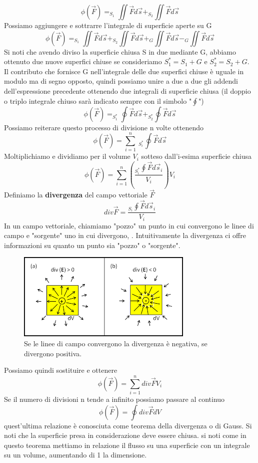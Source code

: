 \documentclass[10pt,a4paper]{article}
\begin{document}
\[\phi(\vec{F}) = _{S_1}\iint \vec{F}d\vec{s}+_{S_2}\iint \vec{F}d\vec{s}\]
Possiamo aggiungere e sottrarre l'integrale di superficie aperte su G 
\[\phi(\vec{F}) = _{S_1}\iint \vec{F}d\vec{s}+_{S_2}\iint \vec{F}d\vec{s}+_{G}\iint \vec{F}d\vec{s}-_{G}\iint \vec{F}d\vec{s}\]
Si noti che avendo diviso la superficie chiusa S in due mediante G, abbiamo ottenuto due nuove superfici chiuse se consideriamo \(S_1^* = S_1+G\) e \(S_2^* = S_2+G\). Il contributo che fornisce G nell'integrale delle due superfici chiuse è uguale in modulo ma di segno opposto, quindi possiamo unire a due a due gli addendi dell'espressione precedente ottenendo due integrali di superficie chiusa (il doppio o triplo integrale chiuso sarà indicato sempre con il simbolo "\(\oint\)")
\[\phi(\vec{F}) = _{S_1^*}\oint \vec{F}d\vec{s}+_{S_2^*}\oint \vec{F}d\vec{s}\]
Possiamo reiterare questo processo di divisione n volte ottenendo
\[\phi(\vec{F}) = \sum_{i=1}^{n}\ _{S_i^*}\oint \vec{F}d\vec{s}\]
Moltiplichiamo e dividiamo per il volume \(V_i\) sotteso dall'i-esima superficie chiusa
\[\phi(\vec{F}) = \sum_{i=1}^{n}\left(\frac{_{S_i^*}\oint \vec{F}d\vec{s}_i}{V_i}\right)V_i\]
Definiamo la \textbf{divergenza} del campo vettoriale $\vec{F}$ 
\[div\vec{F} = \frac{_{S_i}\oint \vec{F}d\vec{s}_i}{V_i}\]
In un campo vettoriale, chiamiamo "pozzo" un punto in cui convergono le linee di campo e "sorgente" uno in cui divergono, . Intuitivamente la divergenza ci offre informazioni su quanto un punto sia "pozzo" o "sorgente". 
\begin{figure}[h!]
	\centering
	\includegraphics[width=0.6\linewidth]{images/div}
	\caption{Se le linee di campo convergono la divergenza è negativa, se divergono positiva.}
	\label{fig:div}
\end{figure}
\FloatBarrier
Possiamo quindi sostituire e ottenere
\[\phi(\vec{F}) = \sum_{i=1}^{n}div\vec{F}V_i\]
Se il numero di divisioni n tende a infinito possiamo passare al continuo 
\[\phi(\vec{F}) = \oint div\vec{F}dV\]
quest'ultima relazione è conosciuta come teorema della divergenza o di Gauss. Si noti che la superficie presa in considerazione deve essere chiusa. si noti come in questo teorema mettiamo in relazione il flusso su una superficie con un integrale su un volume, aumentando di 1 la dimensione.\\
\end{document}
